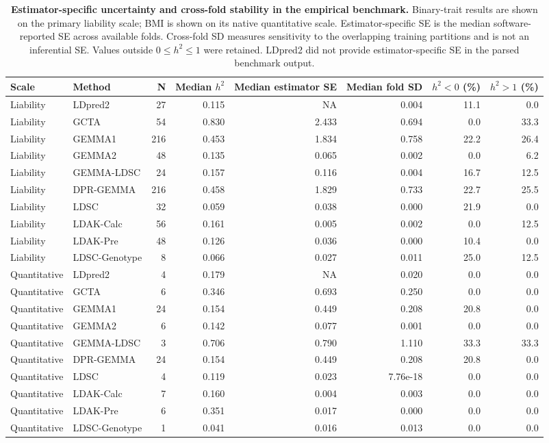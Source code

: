 \begin{table}[!ht]
\centering
\caption{\textbf{Estimator-specific uncertainty and cross-fold stability in the empirical benchmark.} Binary-trait results are shown on the primary liability scale; BMI is shown on its native quantitative scale. Estimator-specific SE is the median software-reported SE across available folds. Cross-fold SD measures sensitivity to the overlapping training partitions and is not an inferential SE. Values outside $0\leq h^2\leq1$ were retained. LDpred2 did not provide estimator-specific SE in the parsed benchmark output.}
\label{tab:uncertainty_main}
\scriptsize
\begin{tabular}{llrrrrrr}
\toprule
Scale & Method & N & Median $h^2$ & Median estimator SE & Median fold SD & $h^2<0$ (\%) & $h^2>1$ (\%) \\
\midrule
Liability & LDpred2 & 27 & 0.115 & NA & 0.004 & 11.1 & 0.0 \\
Liability & GCTA & 54 & 0.830 & 2.433 & 0.694 & 0.0 & 33.3 \\
Liability & GEMMA1 & 216 & 0.453 & 1.834 & 0.758 & 22.2 & 26.4 \\
Liability & GEMMA2 & 48 & 0.135 & 0.065 & 0.002 & 0.0 & 6.2 \\
Liability & GEMMA-LDSC & 24 & 0.157 & 0.116 & 0.004 & 16.7 & 12.5 \\
Liability & DPR-GEMMA & 216 & 0.458 & 1.829 & 0.733 & 22.7 & 25.5 \\
Liability & LDSC & 32 & 0.059 & 0.038 & 0.000 & 21.9 & 0.0 \\
Liability & LDAK-Calc & 56 & 0.161 & 0.005 & 0.002 & 0.0 & 12.5 \\
Liability & LDAK-Pre & 48 & 0.126 & 0.036 & 0.000 & 10.4 & 0.0 \\
Liability & LDSC-Genotype & 8 & 0.066 & 0.027 & 0.011 & 25.0 & 12.5 \\
Quantitative & LDpred2 & 4 & 0.179 & NA & 0.020 & 0.0 & 0.0 \\
Quantitative & GCTA & 6 & 0.346 & 0.693 & 0.250 & 0.0 & 0.0 \\
Quantitative & GEMMA1 & 24 & 0.154 & 0.449 & 0.208 & 20.8 & 0.0 \\
Quantitative & GEMMA2 & 6 & 0.142 & 0.077 & 0.001 & 0.0 & 0.0 \\
Quantitative & GEMMA-LDSC & 3 & 0.706 & 0.790 & 1.110 & 33.3 & 33.3 \\
Quantitative & DPR-GEMMA & 24 & 0.154 & 0.449 & 0.208 & 20.8 & 0.0 \\
Quantitative & LDSC & 4 & 0.119 & 0.023 & 7.76e-18 & 0.0 & 0.0 \\
Quantitative & LDAK-Calc & 7 & 0.160 & 0.004 & 0.003 & 0.0 & 0.0 \\
Quantitative & LDAK-Pre & 6 & 0.351 & 0.017 & 0.000 & 0.0 & 0.0 \\
Quantitative & LDSC-Genotype & 1 & 0.041 & 0.016 & 0.013 & 0.0 & 0.0 \\
\bottomrule
\end{tabular}
\end{table}
